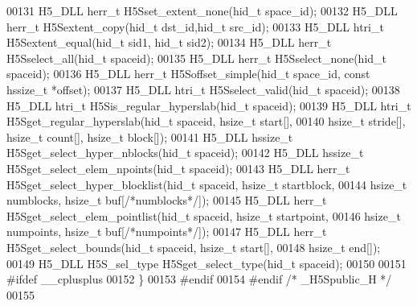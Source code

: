 \begin{DoxyCode}
00131 H5\_DLL herr\_t H5Sset\_extent\_none(hid\_t space\_id);
00132 H5\_DLL herr\_t H5Sextent\_copy(hid\_t dst\_id,hid\_t src\_id);
00133 H5\_DLL htri\_t H5Sextent\_equal(hid\_t sid1, hid\_t sid2);
00134 H5\_DLL herr\_t H5Sselect\_all(hid\_t spaceid);
00135 H5\_DLL herr\_t H5Sselect\_none(hid\_t spaceid);
00136 H5\_DLL herr\_t H5Soffset\_simple(hid\_t space\_id, \textcolor{keyword}{const} hssize\_t *offset);
00137 H5\_DLL htri\_t H5Sselect\_valid(hid\_t spaceid);
00138 H5\_DLL htri\_t H5Sis\_regular\_hyperslab(hid\_t spaceid);
00139 H5\_DLL htri\_t H5Sget\_regular\_hyperslab(hid\_t spaceid, hsize\_t start[],
00140     hsize\_t stride[], hsize\_t count[], hsize\_t block[]);
00141 H5\_DLL hssize\_t H5Sget\_select\_hyper\_nblocks(hid\_t spaceid);
00142 H5\_DLL hssize\_t H5Sget\_select\_elem\_npoints(hid\_t spaceid);
00143 H5\_DLL herr\_t H5Sget\_select\_hyper\_blocklist(hid\_t spaceid, hsize\_t startblock,
00144     hsize\_t numblocks, hsize\_t buf[\textcolor{comment}{/*numblocks*/}]);
00145 H5\_DLL herr\_t H5Sget\_select\_elem\_pointlist(hid\_t spaceid, hsize\_t startpoint,
00146     hsize\_t numpoints, hsize\_t buf[\textcolor{comment}{/*numpoints*/}]);
00147 H5\_DLL herr\_t H5Sget\_select\_bounds(hid\_t spaceid, hsize\_t start[],
00148     hsize\_t end[]);
00149 H5\_DLL H5S\_sel\_type H5Sget\_select\_type(hid\_t spaceid);
00150 
00151 \textcolor{preprocessor}{#ifdef \_\_cplusplus}
00152 \}
00153 \textcolor{preprocessor}{#endif}
00154 \textcolor{preprocessor}{#endif }\textcolor{comment}{/* \_H5Spublic\_H */}\textcolor{preprocessor}{}
00155 
\end{DoxyCode}

